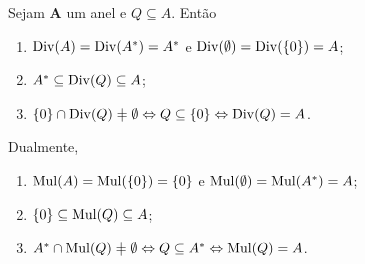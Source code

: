 \begin{proposition}
Sejam $\bm A$ um anel e $Q \subseteq A$. Então
	\begin{enumerate}
	\item $\operatorname{Div}(A) = \operatorname{Div}(A^*) = A^*$ e $\operatorname{Div}(\emptyset) = \operatorname{Div}(\{0\}) = A$;
	\item $A^* \subseteq \operatorname{Div}(Q) \subseteq A$;
	\item $\{0\} \cap \divv(Q) \neq \emptyset \Leftrightarrow Q \subseteq \{0\} \Leftrightarrow \divv(Q)=A$.
	\end{enumerate}

	Dualmente,
	\begin{enumerate}
	\item $\operatorname{Mul}(A) = \operatorname{Mul}(\{0\}) = \{0\}$ e $\operatorname{Mul}(\emptyset) = \operatorname{Mul}(A^*) = A$;
	\item $\{0\} \subseteq \operatorname{Mul}(Q) \subseteq A$;
	\item $A^* \cap \mul(Q) \neq \emptyset \Leftrightarrow Q \subseteq A^* \Leftrightarrow \mul(Q) = A$.
	\end{enumerate}
\end{proposition}

